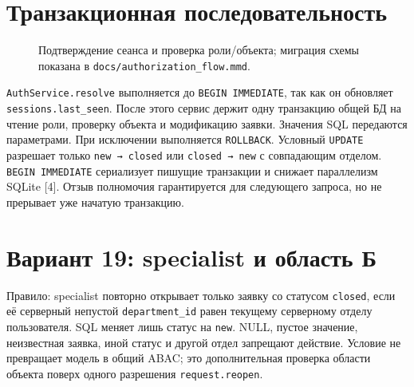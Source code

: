 \documentclass[12pt,a4paper]{article}
\begin{document}
\section{Транзакционная последовательность}
\begin{figure}[H]
\centering
{}
\caption{Подтверждение сеанса и проверка роли/объекта; миграция схемы показана в \texttt{docs/authorization\_flow.mmd}.}
\end{figure}

\texttt{AuthService.resolve} выполняется до \texttt{BEGIN IMMEDIATE}, так как он обновляет \texttt{sessions.last\_seen}. После этого сервис держит одну транзакцию общей БД на чтение роли, проверку объекта и модификацию заявки. Значения SQL передаются параметрами. При исключении выполняется \texttt{ROLLBACK}. Условный \texttt{UPDATE} разрешает только \texttt{new → closed} или \texttt{closed → new} с совпадающим отделом. \texttt{BEGIN IMMEDIATE} сериализует пишущие транзакции и снижает параллелизм SQLite [4]. Отзыв полномочия гарантируется для следующего запроса, но не прерывает уже начатую транзакцию.

\section{Вариант 19: specialist и область Б}
Правило: specialist повторно открывает только заявку со статусом \texttt{closed}, если её серверный непустой \texttt{department\_id} равен текущему серверному отделу пользователя. SQL меняет лишь статус на \texttt{new}. NULL, пустое значение, неизвестная заявка, иной статус и другой отдел запрещают действие. Условие не превращает модель в общий ABAC; это дополнительная проверка области объекта поверх одного разрешения \texttt{request.reopen}.
\end{document}
